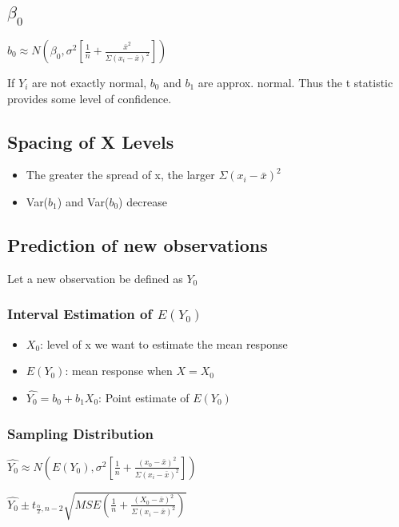 \documentclass[11pt]{article}
\begin{document}
\subsection{\(\beta_0\)}
\label{sec:orgb404294}

\(b_0 \approx N(\beta_0, \sigma^2[\frac{1}{n} + \frac{\bar{x}^2}{\Sigma (x_i - \bar{x})^2}])\)

If \(Y_i\) are not exactly normal, \(b_0\) and \(b_1\) are approx. normal. Thus the t
statistic provides some level of confidence.

\subsection{Spacing of X Levels}
\label{sec:orgcc36791}
\begin{itemize}
\item The greater the spread of x, the larger \(\Sigma (x_i - \bar{x})^2\)
\item Var(\(b_1\)) and Var(\(b_0\)) decrease
\end{itemize}

\subsection{Prediction of new observations}
\label{sec:orgd89e4b9}
Let a new observation be defined as \(Y_0\)

\subsubsection{Interval Estimation of \(E(Y_0)\)}
\label{sec:orgbc1439e}
\begin{itemize}
\item \(X_0\): level of x we want to estimate the mean response
\item \(E(Y_0)\): mean response when \(X = X_0\)
\item \(\hat{Y_0} = b_0 + b_1 X_0\): Point estimate of \(E(Y_0)\)
\end{itemize}

\subsubsection{Sampling Distribution}
\label{sec:orgc7352e3}
\(\hat{Y_0} \approx N(E(Y_0), \sigma^2 [\frac{1}{n} + \frac{(x_0 - \bar{x})^2}{\Sigma
(x_i - \bar{x})^2}])\)

\(\hat{Y_0} \pm t_{\frac{\alpha}{2}, n - 2} \sqrt{MSE (\frac{1}{n} + \frac{(X_0 -
\bar{x})^2}{\Sigma (x_i - \bar{x})^2})}\)
\end{document}
